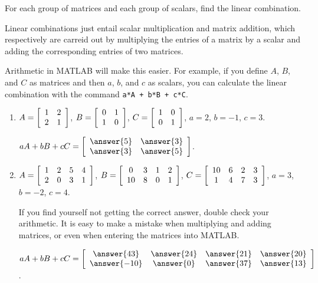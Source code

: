 \documentclass{ximera}
\author{Zack Reed}
\begin{document}
\begin{exercise}

  For each group of matrices and each group of scalars, find the linear combination.

  \begin{hint}
  
    Linear combinations just entail scalar multiplication and matrix addition, which respectively are carreid out by multiplying the entries of a matrix by a scalar and adding the corresponding entries of two matrices.
    
    Arithmetic in MATLAB will make this easier. For example, if you define $A$, $B$, and $C$ as matrices and then $a$, $b$, and $c$ as scalars, you can calculate the linear combination with the command \texttt{a*A + b*B + c*C}.

  \end{hint}

  \begin{enumerate}
    \item
      $A = \startmat{cc}
        1 & 2 \\
        2 & 1
      \stopmat$,\quad
      $B = \startmat{cc}
        0 & 1 \\
        1 & 0
      \stopmat$,\quad
      $C = \startmat{cc}
        1 & 0 \\
        0 & 1
      \stopmat$,\quad
      $a = 2$, $b = -1$, $c = 3$.
  
      $aA + bB + cC = \startmat{cc}
        \answer{5} & \answer{3} \\
        \answer{3} & \answer{5}
      \stopmat$.
  
    \item 
      $A = \startmat{cccc}
        1 & 2 & 5 & 4 \\
        2 & 0 & 3 & 1
      \stopmat$,\quad
      $B = \startmat{cccc}
        0 & 3 & 1 & 2 \\
        10 & 8 & 0 & 1
      \stopmat$,\quad
      $C = \startmat{cccc}
        10 & 6 & 2 & 3 \\
        1 & 4 & 7 & 3
      \stopmat$,\quad
      $a = 3$, $b = -2$, $c = 4$.

      \begin{hint}
      
        If you find yourself not getting the correct answer, double check your arithmetic. It is easy to make a mistake when multiplying and adding matrices, or even when entering the matrices into MATLAB.

      \end{hint}
  
      $aA + bB + cC = \startmat{cccc}
        \answer{43} & \answer{24} & \answer{21} & \answer{20} \\
        \answer{-10} & \answer{0} & \answer{37} & \answer{13}
      \stopmat$.
  
    \end{enumerate}
  

\end{exercise}
\end{document}

